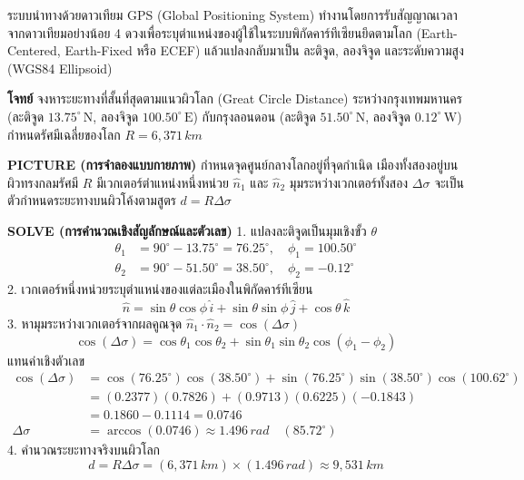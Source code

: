 ระบบนำทางด้วยดาวเทียม GPS (Global Positioning System) ทำงานโดยการรับสัญญาณเวลาจากดาวเทียมอย่างน้อย 4 ดวงเพื่อระบุตำแหน่งของผู้ใช้ในระบบพิกัดคาร์ทีเซียนยึดตามโลก (Earth-Centered, Earth-Fixed หรือ ECEF) แล้วแปลงกลับมาเป็น ละติจูด, ลองจิจูด และระดับความสูง (WGS84 Ellipsoid)

\begin{mathexample}
\textbf{โจทย์} จงหาระยะทางที่สั้นที่สุดตามแนวผิวโลก (Great Circle Distance) ระหว่างกรุงเทพมหานคร (ละติจูด $13.75^\circ\,\text{N}$, ลองจิจูด $100.50^\circ\,\text{E}$) กับกรุงลอนดอน (ละติจูด $51.50^\circ\,\text{N}$, ลองจิจูด $0.12^\circ\,\text{W}$) กำหนดรัศมีเฉลี่ยของโลก $R = 6,371\,\si{km}$

\vspace{0.2cm}
\textbf{PICTURE (การจำลองแบบกายภาพ)}
กำหนดจุดศูนย์กลางโลกอยู่ที่จุดกำเนิด เมืองทั้งสองอยู่บนผิวทรงกลมรัศมี $R$ มีเวกเตอร์ตำแหน่งหนึ่งหน่วย $\hat{n}_1$ และ $\hat{n}_2$ มุมระหว่างเวกเตอร์ทั้งสอง $\Delta\sigma$ จะเป็นตัวกำหนดระยะทางบนผิวโค้งตามสูตร $d = R \Delta\sigma$

\vspace{0.2cm}
\textbf{SOLVE (การคำนวณเชิงสัญลักษณ์และตัวเลข)}
1. แปลงละติจูดเป็นมุมเชิงขั้ว $\theta$
\begin{align}
\theta_1 &= 90^\circ - 13.75^\circ = 76.25^\circ, \quad \phi_1 = 100.50^\circ \\
\theta_2 &= 90^\circ - 51.50^\circ = 38.50^\circ, \quad \phi_2 = -0.12^\circ
\end{align}
2. เวกเตอร์หนึ่งหน่วยระบุตำแหน่งของแต่ละเมืองในพิกัดคาร์ทีเซียน
\begin{equation}
\hat{n} = \sin\theta\cos\phi\,\hat{i} + \sin\theta\sin\phi\,\hat{j} + \cos\theta\,\hat{k}
\end{equation}
3. หามุมระหว่างเวกเตอร์จากผลคูณจุด $\hat{n}_1 \cdot \hat{n}_2 = \cos(\Delta\sigma)$
\begin{equation}
\cos(\Delta\sigma) = \cos\theta_1\cos\theta_2 + \sin\theta_1\sin\theta_2\cos(\phi_1 - \phi_2)
\end{equation}
แทนค่าเชิงตัวเลข
\begin{align}
\cos(\Delta\sigma) &= \cos(76.25^\circ)\cos(38.50^\circ) + \sin(76.25^\circ)\sin(38.50^\circ)\cos(100.62^\circ) \\
&= (0.2377)(0.7826) + (0.9713)(0.6225)(-0.1843) \\
&= 0.1860 - 0.1114 = 0.0746 \\
\Delta\sigma &= \arccos(0.0746) \approx 1.496\,\si{rad} \quad (85.72^\circ)
\end{align}
4. คำนวณระยะทางจริงบนผิวโลก
\begin{equation}
d = R \Delta\sigma = (6,371\,\si{km}) \times (1.496\,\si{rad}) \approx 9,531\,\si{km}
\end{equation}


\end{mathexample}
